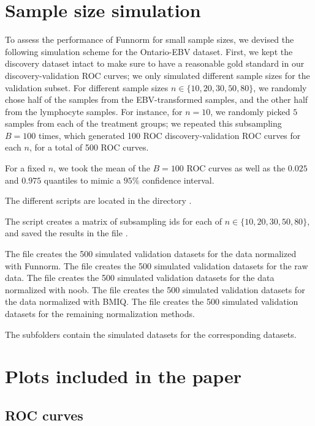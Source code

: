 \documentclass[12pt]{article}
\begin{document}
\section{Sample size simulation}

To assess the performance of Funnorm for small sample sizes, we devised the following simulation scheme for the Ontario-EBV dataset. First, we kept the discovery dataset intact to make sure to have a reasonable gold standard in our discovery-validation ROC curves; we only simulated different sample sizes for the validation subset. For different sample sizes $n \in \{10,20,30,50,80\}$, we randomly chose half of the samples from the EBV-transformed samples, and the other half from the lymphocyte samples. For instance, for $n=10$, we randomly picked $5$ samples from each of the treatment groups; we repeated this subsampling $B=100$ times, which generated 100 ROC discovery-validation ROC curves for each $n$, for a total of 500 ROC curves. 

For a fixed $n$, we took the mean of the $B=100$ ROC curves as well as the $0.025$ and $0.975$ quantiles to mimic  a $95 \%$ confidence interval. 

The different scripts are located in the directory . 

The script  creates a matrix of subsampling ids for each of $n \in \{10,20,30,50,80\}$, and saved the results in the file . 

The file  creates the 500 simulated validation datasets for the data normalized with Funnorm. The file  creates the 500 simulated validation datasets for the raw data. The file  creates the 500 simulated validation datasets for the data normalized with noob. The file  creates the 500 simulated validation datasets for the data normalized with BMIQ.  The file  creates the 500 simulated validation datasets for the remaining normalization methods. 

The subfolders  contain the simulated datasets for the corresponding datasets. 

\section{Plots included in the paper}

\subsection{ROC curves}
\end{document}
